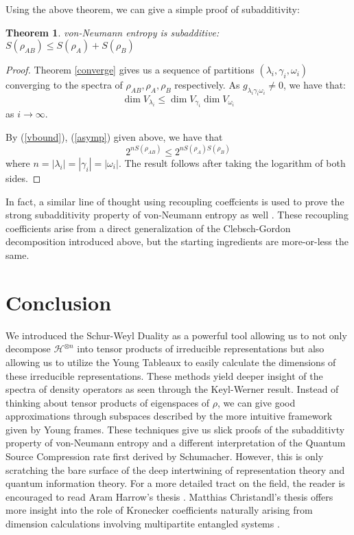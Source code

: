 \documentclass[11pt]{article}%
\newtheorem{thm}{Theorem}
\begin{document}
\noindent Using the above theorem, we can give a simple proof of subadditivity:
\begin{thm}
  von-Neumann entropy is subadditive: $S(\rho_{AB}) \leq S(\rho_A) + S(\rho_B)$
\end{thm}
\begin{proof}
  Theorem \ref{converge} gives us a sequence of partitions $(\lambda_i,\gamma_i, \omega_i)$ converging to the spectra of $\rho_{AB}, \rho_A, \rho_B$ respectively. As $g_{\lambda_i\gamma_i\omega_i} \neq 0$, we have that:
  $$ \dim{V_{\lambda_i}} \leq \dim{V_{\gamma_i}}\dim{V_{\omega_i}} $$ as $i \rightarrow \infty$.

  \noindent By (\ref{vbound}), (\ref{asymp}) given above, we have that
  $$2^{nS(\rho_{AB})} \leq 2^{nS(\rho_A)S(\rho_B)}$$
  where $n = |\lambda_i| = |\gamma_i| = |\omega_i|$. The result follows after taking the logarithm of both sides.
\end{proof}

In fact, a similar line of thought using recoupling coeffcients is used to prove the strong subadditivity property of von-Neumann entropy as well \cite{CSW}. These recoupling coefficients arise from a direct generalization of the Clebsch-Gordon decomposition introduced above, but the starting ingredients are more-or-less the same.

\section{Conclusion}
We introduced the Schur-Weyl Duality as a powerful tool allowing us to not only decompose $\mathcal{H}^{\otimes n}$ into tensor products of irreducible representations but also allowing us to utilize the Young Tableaux to easily calculate the dimensions of these irreducible representations. These methods yield deeper insight of the spectra of density operators as seen through the Keyl-Werner result. Instead of thinking about tensor products of eigenspaces of $\rho$, we can give good approximations through subspaces described by the more intuitive framework given by Young frames. These techniques give us slick proofs of the subadditivty property of von-Neumann entropy and a different interpretation of the Quantum Source Compression rate first derived by Schumacher. However, this is only scratching the bare surface of the deep intertwining of representation theory and quantum information theory. For a more detailed tract on the field, the reader is encouraged to read Aram Harrow's thesis \cite{harrow}. Matthias Christandl's thesis offers more insight into the role of Kronecker coefficients naturally arising from dimension calculations involving multipartite entangled systems \cite{chris}.



\end{document}
